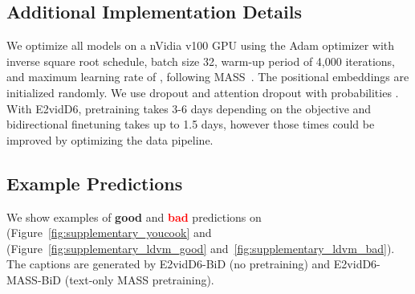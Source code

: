 \documentclass[11pt,a4paper]{article}
\begin{document}
\subsection{Additional Implementation Details~\label{app:implementation}}

We optimize all models on a nVidia v100 GPU using the Adam optimizer with inverse square root schedule, batch size 32, warm-up period of 4,000 iterations, and maximum learning rate of , following MASS~\citep{song2019mass}. The positional embeddings are initialized randomly. We use dropout and attention dropout with probabilities .
 With E2vidD6, pretraining takes 3-6 days depending on the objective and bidirectional finetuning takes up to 1.5 days, however those times could be improved by optimizing the data pipeline.

\subsection{Example Predictions}

We show examples of \textcolor{green!70!black}{\textbf{good}} and \textcolor{red}{\textbf{bad}} predictions on \youcook (Figure~\ref{fig:supplementary_youcook} and \ldvmmerged (Figure~\ref{fig:supplementary_ldvm_good} and~\ref{fig:supplementary_ldvm_bad}).
The captions are generated by E2vidD6-BiD (no pretraining) and E2vidD6-MASS-BiD (text-only MASS pretraining).
\end{document}
